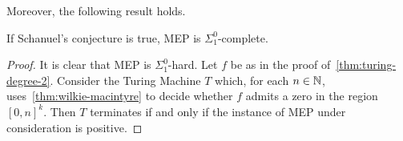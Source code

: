 Moreover, the following result holds.

\begin{theorem}
  If Schanuel's conjecture is true, MEP is $\Sigma_{1}^{0}$-complete.
\end{theorem}

\begin{proof}
  It is clear that MEP is $\Sigma_{1}^{0}$-hard.
  Let $f$ be as in the proof of~\cref{thm:turing-degree-2}. Consider the Turing Machine $T$ which, for each $n \in \mathbb{N}$, uses~\cref{thm:wilkie-macintyre} to decide whether $f$ admits a zero in the region $[0,n]^{k}$. Then $T$ terminates if and only if the instance of MEP under consideration is positive.
\end{proof}
